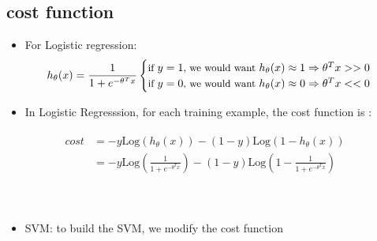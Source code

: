\documentclass[a4paper,12pt]{report}
\begin{document}
\subsection{cost function}
\begin{itemize}
\item For Logistic regression:
\begin{align}
h_{\theta}(x) = \frac{1}{1+e^{-\theta^T x}}
\begin{cases}
    \small{\text{if } y=1 \text{, we would want } h_{\theta}(x) \approx 1 \Rightarrow \theta^T x>>0} \\
		\small{\text{if } y=0 \text{, we would want } h_{\theta}(x) \approx 0 \Rightarrow \theta^T x<<0} \\
  \end{cases}
\end{align}
\end{itemize}
\begin{itemize}
\item In Logistic Regresssion, for each training example, the cost function is :
\end{itemize}
\begin{align}
\begin{split}
cost &= -y \mathrm{Log}(h_{\theta}(x)) - (1-y)\mathrm{Log}(1-h_{\theta}(x)) \\
&= -y \mathrm{Log}\left(\frac{1}{1+e^{-\theta^T x}}\right) - (1-y)\mathrm{Log}\left(1-\frac{1}{1+e^{-\theta^T x}}\right)
\end{split}
\end{align}
\\
\\
\begin{itemize}
\item SVM: to build the SVM, we modify the cost function
\end{itemize}
\end{document}
